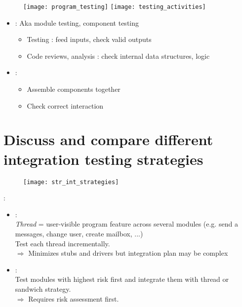 \begin{figure}[H]
    \centering
    \texttt{[image: program\_testing]}\hfill
    \texttt{[image: testing\_activities]}
\end{figure}

\begin{itemize}
    \item {} : Aka module testing, component testing
    \begin{itemize}
        \item Testing : feed inputs, check valid outputs
        \item Code reviews, analysis : check internal data structures, logic 
    \end{itemize}
    \item {} : 
    \begin{itemize}
        \item Assemble components together
        \item Check correct interaction
    \end{itemize}
\end{itemize}

\section{Discuss and compare different integration testing strategies}

\begin{figure}[H]
    \centering
    \texttt{[image: str\_int\_strategies]}
\end{figure}

 :
\begin{itemize}
    \item {} :\\
    \textit{Thread} = user-visible program feature across several modules (e.g. send a messages, change user, create mailbox, ...)\\
    Test each thread incrementally.\\
    $\Rightarrow$ Minimizes stubs and drivers but integration plan may be complex
    \item {} :\\
    Test modules with highest risk first and integrate them with thread or sandwich strategy.\\
    $\Rightarrow$ Requires risk assessment first.
\end{itemize}


